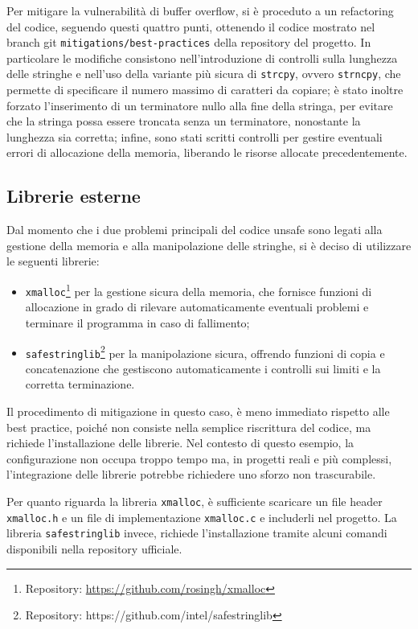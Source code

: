Per mitigare la vulnerabilità di buffer overflow, si è proceduto a un
refactoring del codice, seguendo questi quattro punti, ottenendo il codice
mostrato nel branch git \texttt{mitigations/best-practices} della repository del
progetto. In particolare le modifiche consistono nell'introduzione di controlli
sulla lunghezza delle stringhe e nell'uso della variante più sicura di \texttt{strcpy},
ovvero \texttt{strncpy}, che permette di specificare il numero massimo di
caratteri da copiare; è stato inoltre forzato l'inserimento di un terminatore nullo
alla fine della stringa, per evitare che la stringa possa essere troncata senza
un terminatore, nonostante la lunghezza sia corretta; infine, sono stati scritti
controlli per gestire eventuali errori di allocazione della memoria, liberando
le risorse allocate precedentemente.

\subsection*{Librerie esterne}
\label{sec:librerie-case-study}

Dal momento che i due problemi principali del codice unsafe sono legati alla gestione
della memoria e alla manipolazione delle stringhe, si è deciso di utilizzare le
seguenti librerie:
\begin{itemize}
  \item \texttt{xmalloc}\footnote{Repository: \url{https://github.com/rosingh/xmalloc}}
    per la gestione sicura della memoria, che fornisce funzioni di allocazione
    in grado di rilevare automaticamente eventuali problemi e terminare il
    programma in caso di fallimento;

  \item \texttt{safestringlib}\footnote{Repository: https://github.com/intel/safestringlib}
    per la manipolazione sicura, offrendo funzioni di copia e concatenazione che
    gestiscono automaticamente i controlli sui limiti e la corretta terminazione.
\end{itemize}

Il procedimento di mitigazione in questo caso, è meno immediato rispetto alle best
practice, poiché non consiste nella semplice riscrittura del codice, ma richiede
l'installazione delle librerie. Nel contesto di questo esempio, la configurazione
non occupa troppo tempo ma, in progetti reali e più complessi, l'integrazione delle
librerie potrebbe richiedere uno sforzo non trascurabile.

Per quanto riguarda la libreria \texttt{xmalloc}, è sufficiente scaricare un file
header \texttt{xmalloc.h} e un file di implementazione \texttt{xmalloc.c} e includerli
nel progetto. La libreria \texttt{safestringlib} invece, richiede l'installazione
tramite alcuni comandi disponibili nella repository ufficiale.

